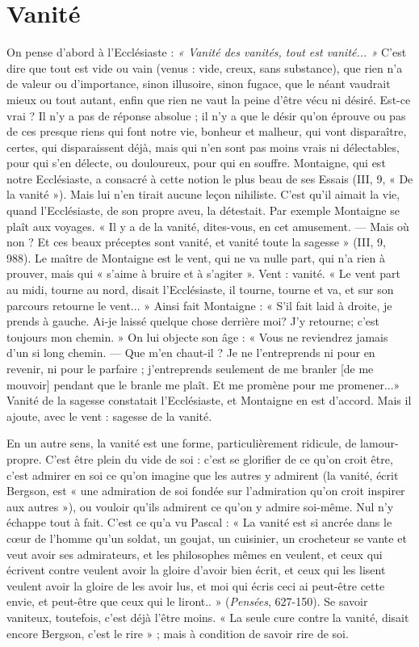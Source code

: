 \section{Vanité}
On pense d’abord à l’Ecclésiaste : {\it « Vanité des vanités, tout est
vanité... »} C’est dire que tout est vide ou vain (venus : vide, creux,
sans substance), que rien n’a de valeur ou d’importance, sinon illusoire, sinon
fugace, que le néant vaudrait mieux ou tout autant, enfin que rien ne vaut la
peine d’être vécu ni désiré. Est-ce vrai ? Il n’y a pas de réponse absolue ; il n’y
a que le désir qu’on éprouve ou pas de ces presque riens qui font notre vie, bonheur
et malheur, qui vont disparaître, certes, qui disparaissent déjà, mais qui
n’en sont pas moins vrais ni délectables, pour qui s’en délecte, ou douloureux,
pour qui en souffre. Montaigne, qui est notre Ecclésiaste, a consacré à cette
notion le plus beau de ses Essais (III, 9, « De la vanité »). Mais lui n’en tirait
aucune leçon nihiliste. C’est qu’il aimait la vie, quand l’Ecclésiaste, de son
propre aveu, la détestait. Par exemple Montaigne se plaît aux voyages. « Il y a
de la vanité, dites-vous, en cet amusement. — Mais où non ? Et ces beaux préceptes
sont vanité, et vanité toute la sagesse » (III, 9, 988). Le maître de Montaigne
est le vent, qui ne va nulle part, qui n’a rien à prouver, mais qui « s’aime
à bruire et à s’agiter ». Vent : vanité. « Le vent part au midi, tourne au nord,
disait l’Ecclésiaste, il tourne, tourne et va, et sur son parcours retourne le
vent... » Ainsi fait Montaigne : « S'il fait laid à droite, je prends à gauche. Ai-je
laissé quelque chose derrière moi? J'y retourne; c’est toujours mon
chemin. » On lui objecte son âge : « Vous ne reviendrez jamais d’un si long
chemin. — Que m'en chaut-il ? Je ne l’entreprends ni pour en revenir, ni pour
le parfaire ; j’entreprends seulement de me branler [de me mouvoir] pendant
que le branle me plaît. Et me promène pour me promener...» Vanité de la
sagesse constatait l’Ecclésiaste, et Montaigne en est d’accord. Mais il ajoute,
avec le vent : sagesse de la vanité.

En un autre sens, la vanité est une forme, particulièrement ridicule, de
lamour-propre. C’est être plein du vide de soi : c’est se glorifier de ce qu’on
croit être, c’est admirer en soi ce qu’on imagine que les autres y admirent (la
vanité, écrit Bergson, est « une admiration de soi fondée sur l’admiration qu’on
croit inspirer aux autres »), ou vouloir qu’ils admirent ce qu’on y admire soi-même.
Nul n’y échappe tout à fait. C’est ce qu’a vu Pascal : « La vanité est si
ancrée dans le cœur de l’homme qu’un soldat, un goujat, un cuisinier, un crocheteur
se vante et veut avoir ses admirateurs, et les philosophes mêmes en veulent,
et ceux qui écrivent contre veulent avoir la gloire d’avoir bien écrit, et ceux
qui les lisent veulent avoir la gloire de les avoir lus, et moi qui écris ceci ai peut-être
cette envie, et peut-être que ceux qui le liront.. » ({\it Pensées}, 627-150). Se
savoir vaniteux, toutefois, c’est déjà l’être moins. « La seule cure contre la
vanité, disait encore Bergson, c’est le rire » ; mais à condition de savoir rire de
soi.

